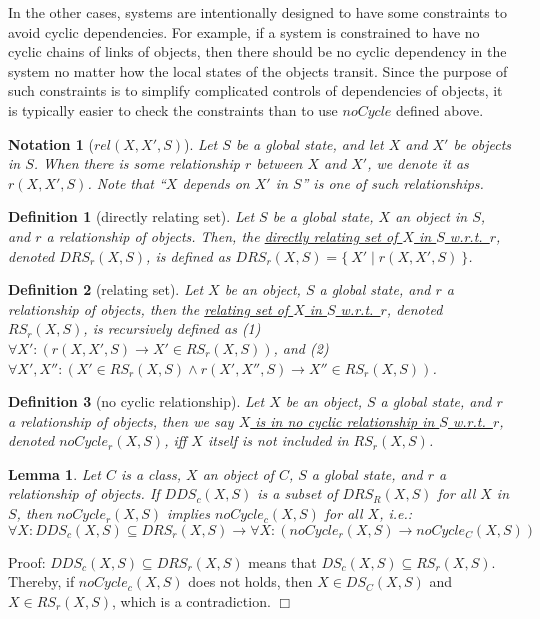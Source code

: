 \documentclass[12pt]{report}
\newtheorem{lemma}{Lemma}
\newtheorem{notation}{Notation}
\newtheorem{definition}{Definition}
\newcommand{\ra}{\rightarrow}
\newcommand{\ul}{\underline}
\begin{document}
In the other cases, systems are intentionally designed to have some constraints
to avoid cyclic dependencies. For example, if a system is constrained to
have no cyclic chains of links of objects, then there should be no
cyclic dependency in the system no matter how the local states of the
objects transit. Since the purpose of such constraints is to simplify
complicated controls of dependencies of objects, it is typically easier
to check the constraints than to use $noCycle$ defined above.

\begin{notation}[$rel(X,X',S)$]
  Let $S$ be a global state, and let $X$ and $X'$ be objects in $S$.  When
  there is some relationship $r$ between $X$ and $X'$, we denote it
  as \ul{$r(X,X',S)$}. Note that ``$X$ depends on $X'$ in $S$'' is one
  of such relationships.
\end{notation}

\begin{definition}[directly relating set]
Let $S$ be a global state, $X$ an object in $S$, and $r$ a
relationship of objects. Then, the \ul{directly relating set of $X$ in
  $S$ w.r.t.\ $r$}, denoted \ul{$\mathit{DRS_r}(X,S)$}, is defined as
$\mathit{DRS_r}(X,S)=\{~X'\mid r(X,X',S)~\}$.
\end{definition}

\begin{definition}[relating set]
Let $X$ be an object, $S$ a global state, and $r$ a relationship
of objects, then the \ul{relating set of $X$ in $S$
  w.r.t.\ $r$}, denoted \ul{$\mathit{RS_r}(X,S)$}, is recursively defined
as (1) $\forall X': (r(X,X',S) \ra X'\in \mathit{RS_r}(X,S))$, and (2)
$\forall X',X'': (X'\in \mathit{RS_r}(X,S) \land r(X',X'',S) \ra X''\in
\mathit{RS_r}(X,S))$.
\end{definition}

\begin{definition}[no cyclic relationship]
Let $X$ be an object, $S$ a global state, and $r$ a relationship
of objects, then we say \ul{$X$ is in no cyclic relationship in $S$
  w.r.t.\ $r$}, denoted \ul{$noCycle_r(X,S)$}, iff $X$ itself is not
included in $\mathit{RS_r}(X,S)$.
\end{definition}

\begin{lemma}
\label{lemma:simplerel}
Let $C$ is a class, $X$ an object of $C$, $S$ a global state,
and $r$ a relationship of objects. If $\mathit{DDS_c}(X,S)$ is a subset of
$\mathit{DRS_R}(X,S)$ for all $X$ in $S$, then $noCycle_r(X,S)$ implies
$noCycle_c(X,S)$ for all $X$, i.e.:
\[\forall X:\mathit{DDS_c}(X,S)\subseteq \mathit{DRS_r}(X,S) \ra \forall X: (noCycle_r(X,S) \ra
noCycle_C(X,S))\]
\end{lemma}
Proof: $\mathit{DDS_c}(X,S)\subseteq \mathit{DRS_r}(X,S)$ means that $\mathit{DS_c}(X,S)\subseteq
\mathit{RS_r}(X,S)$.  Thereby, if $noCycle_c(X,S)$ does not holds, then $X\in
\mathit{DS_C}(X,S)$ and $X\in \mathit{RS_r}(X,S)$, which is a contradiction. $\Box$\\
\end{document}
